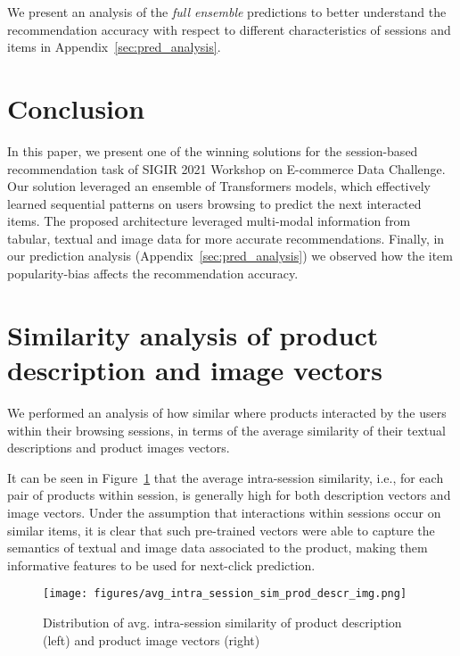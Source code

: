 \documentclass[sigconf,screen]{acmart}
\begin{document}
We present an analysis of the \emph{full ensemble} predictions to better understand the recommendation accuracy with respect to different characteristics of sessions and items in Appendix~\ref{sec:pred_analysis}.


\section{Conclusion}

In this paper, we present one of the winning solutions for the session-based recommendation task of SIGIR 2021 Workshop on E-commerce Data Challenge.
Our solution leveraged an ensemble of Transformers models, which effectively learned sequential patterns on users browsing to predict the next interacted items. The proposed architecture leveraged multi-modal information from tabular, textual and image data for more accurate recommendations. Finally, in our prediction analysis (Appendix~\ref{sec:pred_analysis}) we observed how the item popularity-bias affects the recommendation accuracy.

\appendix

\vspace{-1.0mm}

\section{Similarity analysis of product description and image vectors}
\label{sec:sim_analysis}

We performed an analysis of how similar where products interacted by the users within their browsing sessions, in terms of the average similarity of their textual descriptions and product images vectors.

It can be seen in Figure~\ref{fig:sim_hist} that the average intra-session similarity, i.e., for each pair of products within session, is generally high for both description vectors and image vectors. Under the assumption that interactions within sessions occur on similar items, it is clear that such pre-trained vectors were able to capture the semantics of textual and image data associated to the product, making them informative features to be used for next-click prediction.


\begin{figure}[ht]
  \centering
  \texttt{[image: figures/avg\_intra\_session\_sim\_prod\_descr\_img.png]}
  \caption{Distribution of avg. intra-session similarity of product description (left) and product image vectors (right)}
  \label{fig:sim_hist}
\end{figure}
\end{document}
